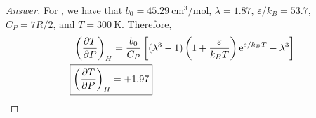 \documentclass[../psets.tex]{subfiles}
\begin{document}
\begin{enumerate}
\begin{enumerate}
        \begin{proof}[Answer]
            For , we have that $b_0=\SI{45.29}{\centi\meter\cubed\per\mole}$, $\lambda=1.87$, $\varepsilon/k_B=53.7$, $C_P=7R/2$, and $T=\SI{300}{\kelvin}$. Therefore,
            \begin{align*}
                \left( \pdv{T}{P} \right)_H &= \frac{b_0}{C_P}\left[ (\lambda^3-1)\left( 1+\frac{\varepsilon}{k_BT} \right)\e[\varepsilon/k_BT]-\lambda^3 \right]\\
                \Aboxed{\left( \pdv{T}{P} \right)_H &= +1.97}
            \end{align*}
        \end{proof}
    \end{enumerate}
\end{enumerate}
\end{document}
